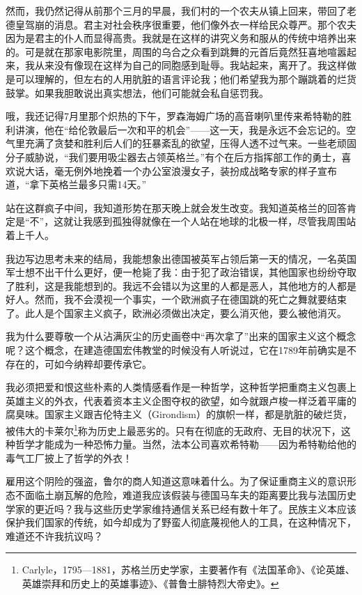 \documentclass[UTF8]{ctexart}
\begin{document}
然而，我仍然记得从前那个三月的早晨，我们村的一个农夫从镇上回来，带回了老德皇驾崩的消息。君主对社会秩序很重要，他们像外衣一样给民众尊严。那个农夫因为是君主的仆人而显得高贵。我就是在这样的讲究义务和服从的传统中培养出来的。可是就在那家电影院里，周围的乌合之众看到跳舞的元首后竟然狂喜地喧嚣起来，我从来没有像现在这样为自己的同胞感到耻辱。我站起来，离开了。我这样做是可以理解的，但左右的人用肮脏的语言评论我；他们希望我为那个蹦跳着的烂货鼓掌。如果我胆敢说出真实想法，他们可能就会私自惩罚我。

哦，我还记得7月里那个炽热的下午，罗森海姆广场的高音喇叭里传来希特勒的胜利讲演，他在“给伦敦最后一次和平的机会”——这一天，我是永远不会忘记的。空气里充满了贪婪和胜利后人们的狂暴紊乱的欲望，压得人透不过气来。一些老顽固分子威胁说，“我们要用吸尘器去占领英格兰。”有个在后方指挥部工作的勇士，喜欢说大话，毫无例外地挽着一个办公室浪漫女子，装扮成战略专家的样子宣布道，“拿下英格兰最多只需14天。”

站在这群疯子中间，我知道形势在那天晚上就会发生改变。我知道英格兰的回答肯定是“不”，这就让我感到孤独得就像在一个人站在地球的北极一样，尽管我周围站着上千人。

我边写边思考未来的结局，我能想象出德国被英军占领后第一天的情况，一名英国军士想不出干什么更好，便一枪毙了我：由于犯了政治错误，其他国家也纷纷夺取了胜利，这是我能想到的。我远不会错以为这里的人都是恶人，其他地方的人都是好人。然而，我不会漠视一个事实，一个欧洲疯子在德国跳的死亡之舞就要结束了。此人是个国家主义疯子，欧洲必须做出决定，要么消灭他，要么被他消灭。

我为什么要尊敬一个从沾满灰尘的历史画卷中“再次拿了”出来的国家主义这个概念呢？这个概念，在建造德国宏伟教堂的时候没有人听说过，它在1789年前确实是不存在的，可如今纳粹却要传承它。

我必须把爱和恨这些朴素的人类情感看作是一种哲学，这种哲学把重商主义包裹上英雄主义的外衣，代表着资本主义企图夺权的欲望，如今就跟卢梭一样泛着平庸的腐臭味。国家主义跟吉伦特主义（Girondism）的旗帜一样，都是肮脏的破烂货，被伟大的卡莱尔\footnote{Carlyle，1795—1881，苏格兰历史学家，主要著作有《法国革命》、《论英雄、英雄崇拜和历史上的英雄事迹》、《普鲁士腓特烈大帝史》。}称为历史上最恶劣的。只有在彻底的无政府、无目的状况下，这种哲学才能成为一种恐怖力量。当然，法本公司喜欢希特勒——因为希特勒给他的毒气工厂披上了哲学的外衣！

雇用这个阴险的强盗，鲁尔的商人知道这意味着什么。为了保证重商主义的意识形态不面临土崩瓦解的危险，难道我应该假装与德国马车夫的距离要比我与法国历史学家的更近吗？我与这些历史学家维持通信关系已经有数十年了。民族主义本应该保护我们国家的传统，如今却成为了野蛮人彻底蔑视他人的工具，在这种情况下，难道还不许我抗议吗？
\end{document}
